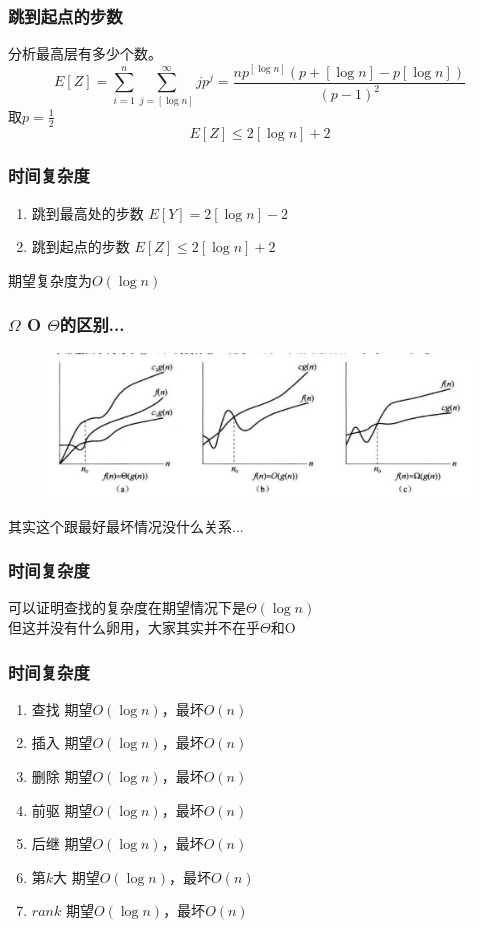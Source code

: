 \documentclass{beamer}
\begin{document}
	\begin{frame}
		\frametitle{跳到起点的步数}
		分析最高层有多少个数。
		$$E[Z] = \sum_{i=1}^{n}\sum_{j=[\log n]}^{\infty}jp^{j} 
		= \frac{np^{[\log{n}]} (p+[\log{n}]-p[\log{n}])}{(p-1)^2} $$
		\pause
		取$p=\frac{1}{2}$\\
		$$E[Z] \leq 2[\log{n}]+2$$
	\end{frame}
	\begin{frame}
		\frametitle{时间复杂度}
		\begin{enumerate}
			\item 跳到最高处的步数 \quad $E[Y] = 2[\log{n}]-2$
			\item 跳到起点的步数 \quad $E[Z] \leq 2[\log{n}]+2$
		\end{enumerate}
		期望复杂度为$O(\log{n})$ \\
	\end{frame}
	\begin{frame}
		\frametitle{$\Omega$ O $\Theta$的区别...}
		\begin{figure}[H]
			\centering
			\includegraphics[scale=0.2]{./img/Ocomplexity.jpg}
		\end{figure}
		\pause
		其实这个跟最好最坏情况没什么关系...
	\end{frame}

	\begin{frame}
		\frametitle{时间复杂度}
		可以证明查找的复杂度在期望情况下是$\Theta(\log{n})$ \\
		但这并没有什么卵用，大家其实并不在乎$\Theta$和O
	\end{frame}
	\begin{frame}
		\frametitle{时间复杂度}
		\begin{enumerate}
			\item 查找 \quad 期望$O(\log n)$，最坏$O(n)$
			\item 插入 \quad 期望$O(\log n)$，最坏$O(n)$
			\item 删除 \quad 期望$O(\log n)$，最坏$O(n)$
			\item 前驱 \quad 期望$O(\log n)$，最坏$O(n)$
			\item 后继 \quad 期望$O(\log n)$，最坏$O(n)$
			\item 第$k$大 \quad 期望$O(\log n)$，最坏$O(n)$
			\item $rank$ \quad 期望$O(\log n)$，最坏$O(n)$
		\end{enumerate}
	\end{frame}
\end{document}
